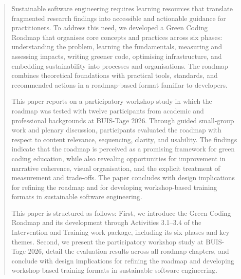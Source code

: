 \documentclass[english]{lni}
\begin{document}
\begin{abstract}

Sustainable software engineering requires learning resources that translate fragmented research findings into accessible and actionable guidance for practitioners. To address this need, we developed a Green Coding Roadmap that organises core concepts and practices across six phases: understanding the problem, learning the fundamentals, measuring and assessing impacts, writing greener code, optimising infrastructure, and embedding sustainability into processes and organisations. The roadmap combines theoretical foundations with practical tools, standards, and recommended actions in a roadmap-based format familiar to developers.

This paper reports on a participatory workshop study in which the roadmap was tested with twelve participants from academic and professional backgrounds at BUIS-Tage 2026. Through guided small-group work and plenary discussion, participants evaluated the roadmap with respect to content relevance, sequencing, clarity, and usability. The findings indicate that the roadmap is perceived as a promising framework for green coding education, while also revealing opportunities for improvement in narrative coherence, visual organisation, and the explicit treatment of measurement and trade-offs. The paper concludes with design implications for refining the roadmap and for developing workshop-based training formats in sustainable software engineering.

This paper is structured as follows: First, we introduce the Green Coding Roadmap and its development through Activities 3.1–3.4 of the Intervention and Training work package, including its six phases and key themes. Second, we present the participatory workshop study at BUIS-Tage 2026, detail the evaluation results across all roadmap chapters, and conclude with design implications for refining the roadmap and developing workshop-based training formats in sustainable software engineering.


\end{abstract}

\end{document}
